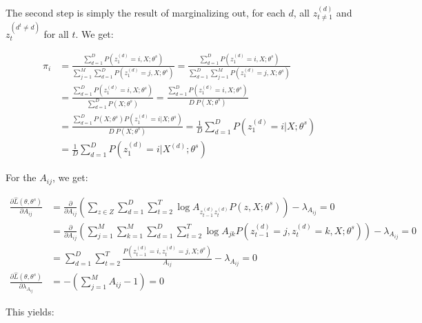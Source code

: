 \documentclass[twoside,11pt]{article}\usepackage{amsmath,amsfonts,amsthm,fullpage}
\begin{document}
The second step is simply the result of marginalizing out, for each $d$, all $z_{t \neq 1}^{(d)}$ and $z_t^{(d^t \neq d)}$ for all $t$. We get:

\begin{equation} \nonumber
\begin{split}
\pi_i &= \frac{\sum^D_{d=1} P(z_1^{(d)} = i, X ; \theta^s)}{\sum^M_{j=1} \sum^D_{d=1} P(z_1^{(d)} = j, X ; \theta^s)} = \frac{\sum^D_{d=1} P(z_1^{(d)} = i, X ; \theta^s)}{\sum^D_{d=1} \sum^M_{j=1}  P(z_1^{(d)} = j, X ; \theta^s)} \\
&= \frac{\sum^D_{d=1} P(z_1^{(d)} = i, X ; \theta^s)}{\sum^D_{d=1} P(X ; \theta^s)} = \frac{\sum^D_{d=1} P(z_1^{(d)} = i, X ; \theta^s)}{D\ P(X ; \theta^s)} \\
&= \frac{\sum^D_{d=1} P(X ; \theta^s) P(z_1^{(d)} = i | X ; \theta^s)}{D\ P(X ; \theta^s)} = \frac{1}{D} \sum^D_{d=1} P(z_1^{(d)} = i | X ; \theta^s) \\
&= \frac{1}{D} \sum^D_{d=1} P(z_1^{(d)} = i | X^{(d)} ; \theta^s)
\end{split}
\end{equation}

For the $A_{ij}$, we get:

\begin{equation} \nonumber
\begin{split}
\frac{\partial \hat{L}(\theta, \theta^s)}{ \partial A_{ij}} &= \frac{\partial}{ \partial A_{ij}} \left( \sum_{z \in Z} \sum^D_{d=1} \sum^T_{t=2} \log A_{{z_{t-1}^{(d)}}{z_{t}^{(d)}}} P(z, X ; \theta^s)  \right) - \lambda_{A_{ij}} = 0 \\
&= \frac{\partial}{ \partial A_{ij}} \left( \sum_{j=1}^M \sum_{k=1}^M \sum^D_{d=1} \sum^T_{t=2} \log A_{jk} P({z_{t-1}^{(d)}} = j,  {z_{t}^{(d)}} = k, X ; \theta^s)  \right) - \lambda_{A_{ij}} = 0 \\
&= \sum^D_{d=1} \sum^T_{t=2} \frac{P({z_{t-1}^{(d)}} = i,  {z_{t}^{(d)}} = j, X ; \theta^s)}{A_{ij}} - \lambda_{A_{ij}} = 0 \\
\frac{\partial \hat{L}(\theta, \theta^s)}{ \partial \lambda_{A_{ij}}} &= - \left( \sum^M_{j=1} A_{ij} - 1 \right) = 0
\end{split}
\end{equation}

This yields:
\end{document}
